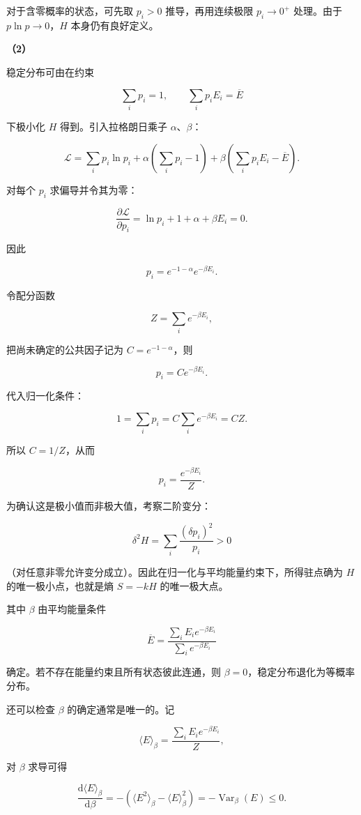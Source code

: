 \documentclass[12pt,a4paper,UTF8]{ctexart}
\begin{document}
对于含零概率的状态，可先取 \(p_i>0\) 推导，再用连续极限 \(p_i\to0^+\)
处理。由于 \(p\ln p\to0\)，\(H\) 本身仍有良好定义。

\textbf{（2）}

稳定分布可由在约束

\[\sum_i p_i=1,\qquad \sum_i p_iE_i=\overline E\]

下极小化 \(H\) 得到。引入拉格朗日乘子 \(\alpha\)、\(\beta\)：

\[\mathcal L=\sum_i p_i\ln p_i
+\alpha\left(\sum_i p_i-1\right)
+\beta\left(\sum_i p_iE_i-\overline E\right).\]

对每个 \(p_i\) 求偏导并令其为零：

\[\frac{\partial\mathcal L}{\partial p_i}
=\ln p_i+1+\alpha+\beta E_i=0.\]

因此

\[p_i=e^{-1-\alpha}e^{-\beta E_i}.\]

令配分函数

\[Z=\sum_i e^{-\beta E_i},\]

把尚未确定的公共因子记为 \(C=e^{-1-\alpha}\)，则

\[p_i=Ce^{-\beta E_i}.\]

代入归一化条件：

\[1=\sum_i p_i
=C\sum_i e^{-\beta E_i}=CZ.\]

所以 \(C=1/Z\)，从而

\[\boxed{p_i=\frac{e^{-\beta E_i}}{Z}}.\]

为确认这是极小值而非极大值，考察二阶变分：

\[\delta^2H=\sum_i\frac{(\delta p_i)^2}{p_i}>0\]

（对任意非零允许变分成立）。因此在归一化与平均能量约束下，所得驻点确为
\(H\) 的唯一极小点，也就是熵 \(S=-kH\) 的唯一极大点。

其中 \(\beta\) 由平均能量条件

\[\overline E=\frac{\sum_iE_ie^{-\beta E_i}}{\sum_i e^{-\beta E_i}}\]

确定。若不存在能量约束且所有状态彼此连通，则
\(\beta=0\)，稳定分布退化为等概率分布。

还可以检查 \(\beta\) 的确定通常是唯一的。记

\[\langle E\rangle_\beta
=\frac{\sum_iE_ie^{-\beta E_i}}{Z},\]

对 \(\beta\) 求导可得

\[\frac{\mathrm d\langle E\rangle_\beta}{\mathrm d\beta}
=-\left(\langle E^2\rangle_\beta-\langle E\rangle_\beta^2\right)
=-\operatorname{Var}_\beta(E)\leq0.\]
\end{document}
